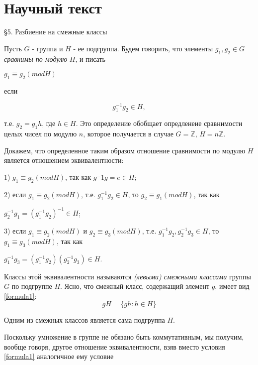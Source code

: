 \section{Научный текст} 
\begin{center}
\S5. Разбиение на смежные классы
\end{center}

Пусть $G$ - группа и $H$ - ее подгруппа. Будем говорить, что элементы $g_1,g_2 \in G$ \emph{сравнимы по модулю} $H$, и писать

\begin{center}
$g_1 \equiv g_2 (mod H)$            
\end{center}

\noindent если

\begin{equation}
g_1^{-1} g_2 \in H,
\end{equation}

\noindent т.е. $g_2 = g_1 h$, где $h \in H$. Это определение обобщает опредленеие сравнимости целых чисел по модулю $n$, которое получается в случае $G = \mathbb{Z}$, $H = n\mathbb{Z}$.
\par Докажем, что определенное таким образом отношение сравнимости по модулю $H$ является отношением эквивалентности:
\par 1) $g_1 \equiv g_2 (mod H)$, так как $g^-1 g = e \in H $;
\par 2) если $g_1 \equiv g_2 (mod H)$, т.е. $g_1^{-1} g_2 \in H$, то $g_2 \equiv g_1 (mod H)$, так как

\begin{center}
$g_2^{-1} g_1 = (g_1^{-1} g_2)^{-1} \in H$;
\end{center}

\par 3) если $g_1 \equiv g_2 (mod H)$ и $g_2 \equiv g_3 (mod H)$, т.е. $g_1^{-1} g_2, g_2^{-1} g_3 \in H$, то $g_1 \equiv g_3 (mod H)$, так как

\begin{center}
$g_1^{-1} g_3 = (g_1^{-1} g_2)(g_2^{-1} g_3) \in H$.            
\end{center}

Классы этой эквивалентности называются \emph{(левыми) смежными классами} группы $G$ по подгруппе $H$. Ясно, что смежный класс, содержащий элемент $g$, имеет вид
\eqref{formula1}:
\begin{equation} \label{formula1} gH = \{gh: h \in H\} \end{equation}

\noindent Одним из смежных классов является сама подгруппа $H$.
\par Поскольку умножение в группе не обязано быть коммутативным, мы получим, вообще говоря, другое отношение эквивалентности, взяв вместо условия \eqref{formula1} аналогичное ему условие

